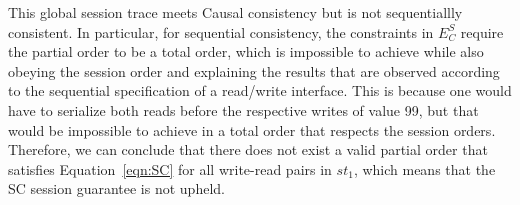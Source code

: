 \documentclass[journal, compsoc]{IEEEtran}
\begin{document}
	This global session trace meets Causal consistency but is not sequentiallly consistent.
	In particular, for sequential consistency, the constraints in $E^S_C$ require the partial order to be a total order, which is impossible to achieve while also obeying the session order and explaining the results that are observed according to the sequential specification of a read/write interface. This is because one would have to serialize both reads before the respective writes of value 99, but that would be impossible to achieve in a total order that respects the session orders.
	Therefore, we can conclude that there does not exist a valid partial order that satisfies Equation~\ref{eqn:SC} for all write-read pairs in $\mathit{st}_1$, which means that the SC session guarantee is not upheld.
\end{document}
